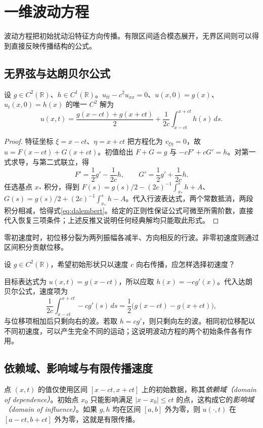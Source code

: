\setcounter{chapter}{6} %
\chapter{一维波动方程}
\label{chap:wave-one}

波动方程把初始扰动沿特征方向传播。有限区间适合模态展开，无界区间则可以得到直接反映传播结构的公式。

\section{无界弦与达朗贝尔公式}
\begin{theorem}[达朗贝尔公式]
设 $g\in C^2(\mathbb R)$、$h\in C^1(\mathbb R)$。$u_{tt}-c^2u_{xx}=0$、$u(x,0)=g(x)$、$u_t(x,0)=h(x)$ 的唯一 $C^2$ 解为
\begin{equation}
 u(x,t)=\frac{g(x-ct)+g(x+ct)}2+
 \frac1{2c}\int_{x-ct}^{x+ct}h(s)\,ds.
 \label{eq:dalembert}
\end{equation}
\end{theorem}
\begin{proof}
特征坐标 $\xi=x-ct$、$\eta=x+ct$ 把方程化为 $v_{\xi\eta}=0$，故 $u=F(x-ct)+G(x+ct)$。初值给出 $F+G=g$ 与 $-cF'+cG'=h$。对第一式求导，与第二式联立，得
\[
 F'=\frac12g'-\frac1{2c}h,\qquad
 G'=\frac12g'+\frac1{2c}h.
\]
任选基点 $x_*$ 积分，得到 $F(s)=g(s)/2-(2c)^{-1}\int_{x_*}^s h+A$、$G(s)=g(s)/2+(2c)^{-1}\int_{x_*}^s h-A$。代入行波表达式，两个常数抵消，两段积分相减，恰得式\eqref{eq:dalembert}。给定的正则性保证公式可微至所需阶数，直接代入恢复三项条件；上述反推又说明任何经典解均只能取此形式。
\end{proof}
零初速度时，初位移分裂为两列振幅各减半、方向相反的行波。非零初速度则通过区间积分贡献位移。

\begin{example}[如何产生单向行波]
设 $g\in C^2(\mathbb R)$，希望初始形状只以速度 $c$ 向右传播，应怎样选择初速度？
\end{example}
\begin{solve}
目标表达式为 $u(x,t)=g(x-ct)$，所以应取 $h(x)=-cg'(x)$。代入达朗贝尔公式，速度项为
\[
 \frac1{2c}\int_{x-ct}^{x+ct}-cg'(s)\,ds
 =\frac12\bigl(g(x-ct)-g(x+ct)\bigr),
\]
与位移项相加后只剩向右的波。若取 $h=cg'$，则只剩向左的波。相同初位移配以不同初速度，可以产生完全不同的运动；这说明波动方程的两个初始条件各有作用。
\end{solve}

\section{依赖域、影响域与有限传播速度}
点 $(x,t)$ 的值仅使用区间 $[x-ct,x+ct]$ 上的初始数据，称其\emph{依赖域（domain of dependence）}。初始点 $x_0$ 只能影响满足 $|x-x_0|\le ct$ 的点，这构成它的\emph{影响域（domain of influence）}。如果 $g,h$ 均在区间 $[a,b]$ 外为零，则 $u(\cdot,t)$ 在 $[a-ct,b+ct]$ 外为零，这就是有限传播。

